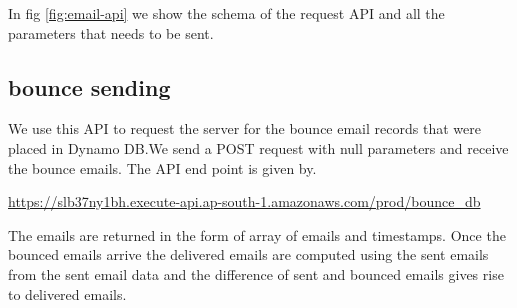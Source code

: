 In fig \ref{fig:email-api} we show the schema of the request API and all the parameters that needs to be sent. 
\subsection{bounce sending}
We use this API to request the server for the bounce email records that were placed in Dynamo DB.We send a POST request with null parameters and receive the bounce emails. The API end point is given by.

\url{https://slb37ny1bh.execute-api.ap-south-1.amazonaws.com/prod/bounce\_db}

The emails are returned in the form of array of emails and timestamps. Once the bounced emails arrive the delivered emails are computed using the sent emails from the sent email data and the difference of sent and bounced emails gives rise to delivered emails.



